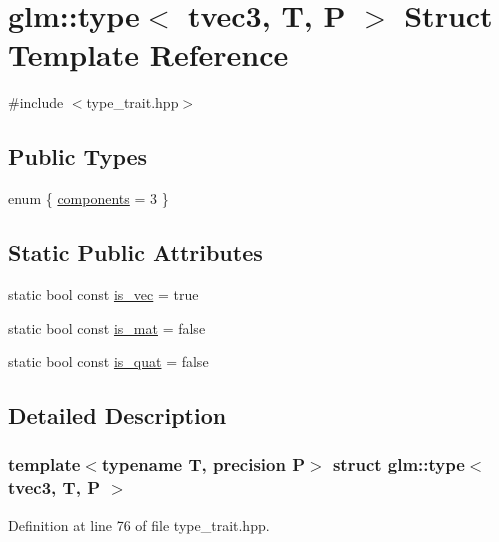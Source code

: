 \hypertarget{structglm_1_1type_3_01tvec3_00_01_t_00_01_p_01_4}{}\section{glm\+::type$<$ tvec3, T, P $>$ Struct Template Reference}
\label{structglm_1_1type_3_01tvec3_00_01_t_00_01_p_01_4}


{\ttfamily \#include $<$type\+\_\+trait.\+hpp$>$}

\subsection*{Public Types}
\begin{DoxyCompactItemize}
\item 
enum \{ \mbox{\hyperlink{structglm_1_1type_3_01tvec3_00_01_t_00_01_p_01_4_ae2ed44078c22b099667c031cecea1d5cac64bc0270614bf0e2d5def43741771dc}{components}} = 3
 \}
\end{DoxyCompactItemize}
\subsection*{Static Public Attributes}
\begin{DoxyCompactItemize}
\item 
static bool const \mbox{\hyperlink{structglm_1_1type_3_01tvec3_00_01_t_00_01_p_01_4_a6932aaf64b066720cdf04b0675e21ef0}{is\+\_\+vec}} = true
\item 
static bool const \mbox{\hyperlink{structglm_1_1type_3_01tvec3_00_01_t_00_01_p_01_4_aa59dc278af68be9ba7ca8f98b5a25630}{is\+\_\+mat}} = false
\item 
static bool const \mbox{\hyperlink{structglm_1_1type_3_01tvec3_00_01_t_00_01_p_01_4_a6650d3af422d07f8b071c19dd59bd173}{is\+\_\+quat}} = false
\end{DoxyCompactItemize}


\subsection{Detailed Description}
\subsubsection*{template$<$typename T, precision P$>$\newline
struct glm\+::type$<$ tvec3, T, P $>$}



Definition at line 76 of file type\+\_\+trait.\+hpp.




